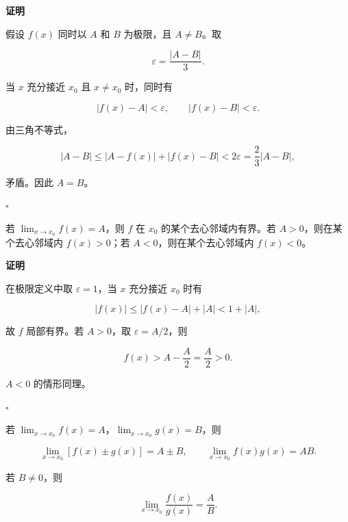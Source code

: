 \documentclass[fontset=fandol]{ctexart}
\newenvironment{proofdetail}{\par\noindent\textbf{证明}\quad}{\hfill$\square$\par\vspace{0.8em}}
\begin{document}
\begin{proofdetail}

假设 \(f(x)\) 同时以 \(A\) 和 \(B\) 为极限，且 \(A\neq B\)。取

\[

\varepsilon=\frac{|A-B|}{3}.

\]

当 \(x\) 充分接近 \(x_0\) 且 \(x\neq x_0\) 时，同时有

\[

|f(x)-A|<\varepsilon,\qquad |f(x)-B|<\varepsilon.

\]

由三角不等式，

\[

|A-B|\leq |A-f(x)|+|f(x)-B|<2\varepsilon=\frac23|A-B|,

\]

矛盾。因此 \(A=B\)。

\end{proofdetail}



\begin{proposition}[局部有界性与保号性]

若 \(\lim_{x\to x_0}f(x)=A\)，则 \(f\) 在 \(x_0\) 的某个去心邻域内有界。若 \(A>0\)，则在某个去心邻域内 \(f(x)>0\)；若 \(A<0\)，则在某个去心邻域内 \(f(x)<0\)。

\end{proposition}

\begin{proofdetail}

在极限定义中取 \(\varepsilon=1\)，当 \(x\) 充分接近 \(x_0\) 时有

\[

|f(x)|\leq |f(x)-A|+|A|<1+|A|,

\]

故 \(f\) 局部有界。若 \(A>0\)，取 \(\varepsilon=A/2\)，则

\[

f(x)>A-\frac A2=\frac A2>0.

\]

\(A<0\) 的情形同理。

\end{proofdetail}



\begin{theorem}[四则运算法则]

若 \(\lim_{x\to x_0}f(x)=A\)，\(\lim_{x\to x_0}g(x)=B\)，则

\[

\lim_{x\to x_0}[f(x)\pm g(x)]=A\pm B,\qquad

\lim_{x\to x_0}f(x)g(x)=AB.

\]

若 \(B\neq0\)，则

\[

\lim_{x\to x_0}\frac{f(x)}{g(x)}=\frac AB.

\]

\end{theorem}
\end{document}
